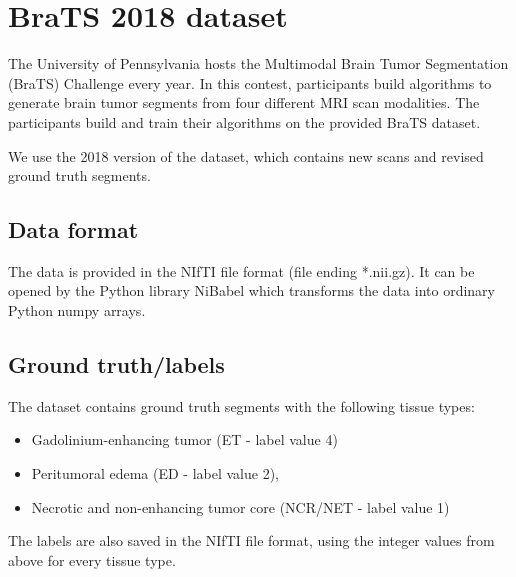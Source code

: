\section{BraTS 2018 dataset}
The University of Pennsylvania hosts the Multimodal Brain Tumor Segmentation (BraTS) Challenge \cite{bratschallenge}  every year. In this contest, participants build algorithms to generate brain tumor segments from four different MRI scan modalities. The participants build and train their algorithms on the provided BraTS \cite{menze2015multimodal} dataset.

We use the 2018 version of the dataset, which contains new scans and revised ground truth segments.

\subsection{Data format}
The data is provided in the NIfTI file format (file ending *.nii.gz). It can be opened by the Python library NiBabel\cite{nibabel} which transforms the data into ordinary Python numpy arrays.

\subsection{Ground truth/labels}
The dataset contains ground truth segments with the following tissue types:

\begin{itemize}
    \item Gadolinium-enhancing tumor (ET - label value 4)
    \item Peritumoral edema (ED - label value 2),
    \item Necrotic and non-enhancing tumor core (NCR/NET - label value 1)
\end{itemize}

The labels are also saved in the NIfTI file format, using the integer values from above for every tissue type.
